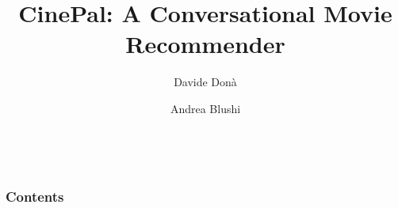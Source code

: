 \documentclass[10pt]{beamer}
\begin{document}
\title{CinePal: A Conversational Movie Recommender}
\author[University of Trento]{Davide Donà \and Andrea Blushi}


\date[]{\MonthName\ \number\year}

\frame{\titlepage}
\begin{frame}
\frametitle{Contents}
\tableofcontents
\end{frame}




\end{document}

